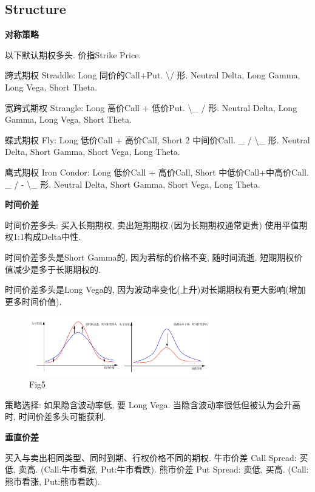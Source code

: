 \documentclass[UTF8]{ctexart}
\begin{document}
\subsection{Structure}


\noindent \textbf{对称策略} \par 

以下默认期权多头. 价指Strike Price.

跨式期权 Straddle: Long 同价的Call+Put.
\textbackslash / 形.
Neutral Delta, Long Gamma, Long Vega, Short Theta.

宽跨式期权 Strangle: Long 高价Call + 低价Put.
\textbackslash \_ / 形.
Neutral Delta, Long Gamma, Long Vega, Short Theta.

蝶式期权 Fly: Long 低价Call + 高价Call, Short 2 中间价Call.
\_ / \textbackslash \_ 形.
Neutral Delta, Short Gamma, Short Vega, Long Theta.

鹰式期权 Iron Condor: Long 低价Call + 高价Call, Short 中低价Call+中高价Call.
\_ / - \textbackslash \_ 形.
Neutral Delta, Short Gamma, Short Vega, Long Theta.

\noindent \textbf{时间价差} \par 
时间价差多头: 买入长期期权, 卖出短期期权.(因为长期期权通常更贵)
使用平值期权1:1构成Delta中性.

时间价差多头是Short Gamma的, 因为若标的价格不变, 随时间流逝, 短期期权价值减少是多于长期期权的.

时间价差多头是Long Vega的, 因为波动率变化(上升)对长期期权有更大影响(增加更多时间价值).

\begin{figure}[H]
    \centering
    \includegraphics[width=0.7\textwidth]{fig/fig5.png}
    \caption{Fig5}
\end{figure}

策略选择: 如果隐含波动率低, 要 Long Vega.
当隐含波动率很低但被认为会升高时, 时间价差多头可能获利.

\noindent \textbf{垂直价差} \par 
买入与卖出相同类型、同时到期、行权价格不同的期权.
牛市价差 Call Spread: 买低, 卖高. (Call:牛市看涨, Put:牛市看跌).
熊市价差 Put Spread: 卖低, 买高. (Call:熊市看涨, Put:熊市看跌).
\end{document}
